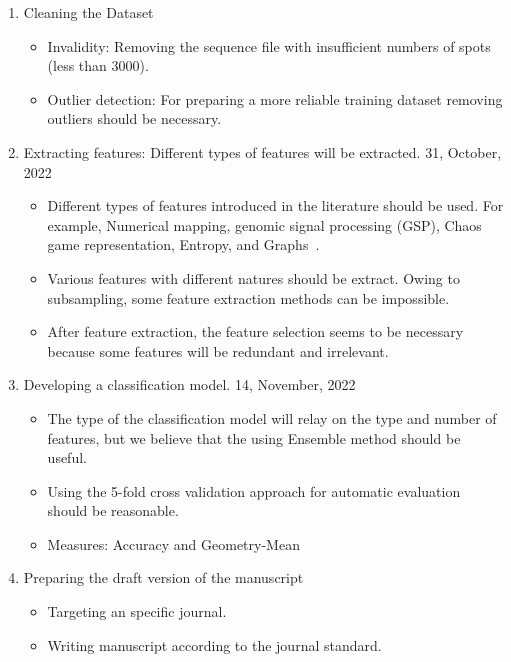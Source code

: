 \documentclass[a4paper]{article}
\newcommand{\deadline}[1]{{\color{blue} \hfill{#1} }}
\begin{document}
\begin{enumerate}
\begin{itemize}
        \end{itemize}
        \item Cleaning the Dataset
        \begin{itemize}
            \item Invalidity: Removing the sequence file with insufficient numbers of spots (less than 3000).
            \item Outlier detection: For preparing a more reliable training dataset removing outliers should be necessary.
        \end{itemize}
        \item Extracting features: Different types of features will be extracted. \deadline{31, October, 2022}
        \begin{itemize}
            \item Different types of features introduced in the literature should be used.
            For example, Numerical mapping, genomic signal processing (GSP), Chaos game representation, Entropy, and Graphs~\cite{RF101}.
            \item Various features with different natures should be extract.
            Owing to subsampling, some feature extraction methods can be impossible.
            \item After feature extraction, the feature selection seems to be necessary because some features will be redundant and irrelevant.
        \end{itemize}
        \item Developing a classification model.  \deadline{14, November, 2022}
        \begin{itemize}
            \item The type of the classification model will relay on the type and number of features, but we believe that the using Ensemble method should be useful.
            \item Using the 5-fold cross validation approach for automatic evaluation should be reasonable.
            \item Measures: Accuracy and Geometry-Mean
        \end{itemize}
        \item Preparing the draft version of the manuscript
        \begin{itemize}
            \item Targeting an specific journal.
            \item Writing manuscript according to the journal standard.
        \end{itemize}

\end{enumerate}
\end{document}
